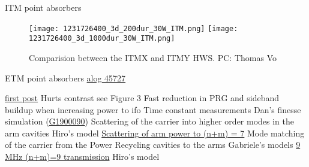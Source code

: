 
 \begin{outline}
    \1 ITM point absorbers
     \begin{figure}[H]
            \centering
            \texttt{[image: 1231726400\_3d\_200dur\_30W\_ITM.png]}
            \texttt{[image: 1231726400\_3d\_1000dur\_30W\_ITM.png]}
            \caption{Comparision between the ITMX and ITMY HWS. PC: Thomas Vo}
      \end{figure}
        
    \2 ETM point absorbers
        \3 \href{https://alog.ligo-wa.caltech.edu/aLOG/index.php?callRep=45727}{alog 45727}
        
        \3 \href{https://alog.ligo-wa.caltech.edu/aLOG/index.php?callRep=44952}{first post}
    \2 Hurts contrast see Figure 3
    \2 Fast reduction in PRG and sideband buildup when increasing power to ifo
        \3 Time constant measurements
        \3 Dan's finesse simulation (\href{https://dcc.ligo.org/DocDB/0158/G1900090/002/20190116_tcs_call.pdf}{G1900090})
    \2 Scattering of the carrier into higher order modes in the arm cavities
        \3 Hiro's model
            \4 \href{https://dcc.ligo.org/DocDB/0158/G1900257/001/G1900257-v1.pdf}{Scattering of arm power to (n+m) = 7} 
    \1 Mode matching of the carrier from the Power Recycling cavities to the arms
        \2 Gabriele's models
            \3 \href{https://alog.ligo-wa.caltech.edu/aLOG/index.php?callRep=47027}{9 MHz (n+m)=9 transmission}
        \2 Hiro's model
 \end{outline}